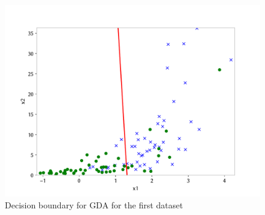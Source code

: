 \FloatBarrier

\begin{answer}
    \begin{figure}[h]
        \centering
        \includegraphics*[width=.7\linewidth]{../src/linearclass/gda_pred_1.pdf}
        \caption{Decision boundary for GDA for the first dataset}        
    \end{figure}

\end{answer}

\FloatBarrier
